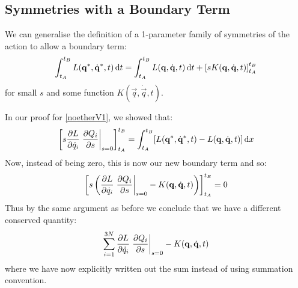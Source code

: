 \documentclass[../main.tex]{subfiles}
\begin{document}
\subsection{Symmetries with a Boundary Term}
We can generalise the definition of a 1-parameter family of symmetries of the action to allow a boundary term:
\[
  \int_{t_A}^{t_B} L(\vec{q}^{*}, \dot{\vec{q}}^{*}, t) \d{t} = \int_{t_A}^{t_B} L(\vec{q}, \dot{\vec{q}}, t) \d{t} + \eval{sK(\vec{q}, \dot{\vec{q}}, t)}{t_A}{t_B}
\]
for small $s$ and some function $K(\vec{q}, \dot{\vec{q}}, t)$.

In our proof for \cref{noetherV1}, we showed that:
\[
  \eval{s \pderiv{L}{\dot{q}_i} \at{\pderiv{Q_i}{s}}{s = 0}}{t_A}{t_B} = \int_{t_A}^{t_B} [L(\vec{q}^{*}, \dot{\vec{q}}^{*}, t) - L(\vec{q}, \dot{\vec{q}}, t)] \d{x}
\]
Now, instead of being zero, this is now our new boundary term and so:
\[
  \eval{s\left(\pderiv{L}{\dot{q}_i} \at{\pderiv{Q_i}{s}}{s = 0} - K(\vec{q}, \dot{\vec{q}}, t)\right)}{t_A}{t_B} = 0
\]
Thus by the same argument as before we conclude that we have a different conserved quantity:
\begin{equation}
  \sum_{i = 1}^{3N} \pderiv{L}{\dot{q}_i} \at{\pderiv{Q_i}{s}}{s = 0} - K(\vec{q}, \dot{\vec{q}}, t) \label{boundConserved}
\end{equation}
where we have now explicitly written out the sum instead of using summation convention.
\end{document}
